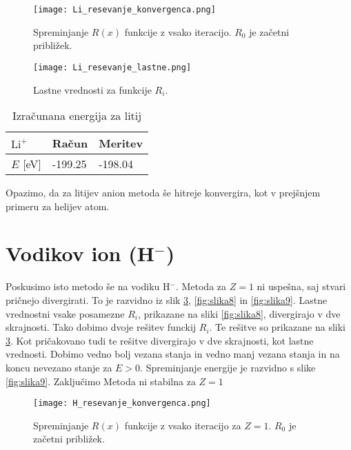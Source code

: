 \documentclass[12pt,a4paper]{article}
\begin{document}
\begin{figure}[H]
\begin{center}
\texttt{[image: Li\_resevanje\_konvergenca.png]}
\caption{Spreminjanje $R(x)$ funkcije z vsako iteracijo. $R_0$ je začetni približek. } \label{fig:slika5}
\end{center}
\end{figure}

\begin{figure}[H]
\begin{center}
\texttt{[image: Li\_resevanje\_lastne.png]}
\caption{Lastne vrednosti za funkcije $R_i$. } \label{fig:slika6}
\end{center}
\end{figure}

\begin{table}[H] 
\begin{center}
\begin{tabular}{|l|l|l|}
\hline
$\textrm{Li}^{+}$      & Račun  & Meritev \\ \hline
$E$ [eV] & -199.25 & -198.04  \\ \hline
\end{tabular}
\end{center}
\caption{Izračunana energija za litij}
\label{table:tabela2}
\end{table}

\noindent Opazimo, da za litijev anion metoda še  hitreje konvergira, kot v prejšnjem primeru za helijev atom. 

\section*{Vodikov ion (H$^{-}$)}

Poskusimo isto metodo še na vodiku H$^{-}$. Metoda za $Z=1$ ni uspešna, saj stvari pričnejo divergirati. To je razvidno iz slik \ref{fig:slika7}, \ref{fig:slika8} in \ref{fig:slika9}.
Lastne vrednostni vsake posamezne $R_i$, prikazane na sliki \ref{fig:slika8}, divergirajo v dve skrajnosti. Tako dobimo dvoje rešitev funckij $R_i$. Te rešitve so prikazane na sliki \ref{fig:slika7}. Kot pričakovano tudi te rešitve divergirajo v dve skrajnosti, kot lastne vrednosti. Dobimo vedno bolj vezana stanja in vedno manj vezana stanja in na koncu nevezano stanje za $E>0$. Spreminjanje energije je razvidno s slike \ref{fig:slika9}. Zaključimo Metoda ni stabilna za $Z=1$

\begin{figure}[H]
\begin{center}
\texttt{[image: H\_resevanje\_konvergenca.png]}
\caption{Spreminjanje $R(x)$ funkcije z vsako iteracijo za $Z=1$. $R_0$ je začetni približek. } \label{fig:slika7}
\end{center}
\end{figure}
\end{document}
